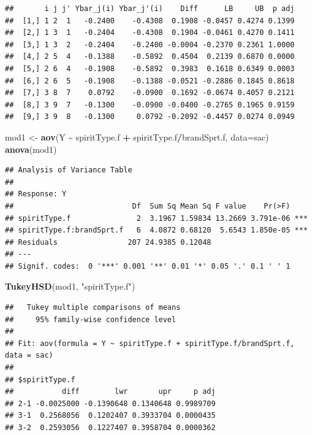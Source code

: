 \documentclass[
]{book}
\newenvironment{Shaded}{\begin{snugshade}}{\end{snugshade}}
\newcommand{\AttributeTok}[1]{\textcolor[rgb]{0.13,0.29,0.53}{#1}}
\newcommand{\FunctionTok}[1]{\textcolor[rgb]{0.13,0.29,0.53}{\textbf{#1}}}
\newcommand{\NormalTok}[1]{#1}
\newcommand{\OtherTok}[1]{\textcolor[rgb]{0.56,0.35,0.01}{#1}}
\newcommand{\SpecialCharTok}[1]{\textcolor[rgb]{0.81,0.36,0.00}{\textbf{#1}}}
\newcommand{\StringTok}[1]{\textcolor[rgb]{0.31,0.60,0.02}{#1}}
\begin{document}
\begin{verbatim}
##       i j j' Ybar_j(i) Ybar_j'(i)    Diff      LB     UB  p adj
##  [1,] 1 2  1   -0.2400    -0.4308  0.1908 -0.0457 0.4274 0.1399
##  [2,] 1 3  1   -0.2404    -0.4308  0.1904 -0.0461 0.4270 0.1411
##  [3,] 1 3  2   -0.2404    -0.2400 -0.0004 -0.2370 0.2361 1.0000
##  [4,] 2 5  4   -0.1388    -0.5892  0.4504  0.2139 0.6870 0.0000
##  [5,] 2 6  4   -0.1908    -0.5892  0.3983  0.1618 0.6349 0.0003
##  [6,] 2 6  5   -0.1908    -0.1388 -0.0521 -0.2886 0.1845 0.8618
##  [7,] 3 8  7    0.0792    -0.0900  0.1692 -0.0674 0.4057 0.2121
##  [8,] 3 9  7   -0.1300    -0.0900 -0.0400 -0.2765 0.1965 0.9159
##  [9,] 3 9  8   -0.1300     0.0792 -0.2092 -0.4457 0.0274 0.0949
\end{verbatim}

\begin{Shaded}
\begin{Highlighting}[]
\NormalTok{mod1 }\OtherTok{\textless{}{-}} \FunctionTok{aov}\NormalTok{(Y }\SpecialCharTok{\textasciitilde{}}\NormalTok{ spiritType.f }\SpecialCharTok{+}\NormalTok{ spiritType.f}\SpecialCharTok{/}\NormalTok{brandSprt.f, }\AttributeTok{data=}\NormalTok{sac)}
\FunctionTok{anova}\NormalTok{(mod1)}
\end{Highlighting}
\end{Shaded}

\begin{verbatim}
## Analysis of Variance Table
## 
## Response: Y
##                           Df  Sum Sq Mean Sq F value    Pr(>F)    
## spiritType.f               2  3.1967 1.59834 13.2669 3.791e-06 ***
## spiritType.f:brandSprt.f   6  4.0872 0.68120  5.6543 1.850e-05 ***
## Residuals                207 24.9385 0.12048                      
## ---
## Signif. codes:  0 '***' 0.001 '**' 0.01 '*' 0.05 '.' 0.1 ' ' 1
\end{verbatim}

\begin{Shaded}
\begin{Highlighting}[]
\FunctionTok{TukeyHSD}\NormalTok{(mod1, }\StringTok{"spiritType.f"}\NormalTok{)}
\end{Highlighting}
\end{Shaded}

\begin{verbatim}
##   Tukey multiple comparisons of means
##     95% family-wise confidence level
## 
## Fit: aov(formula = Y ~ spiritType.f + spiritType.f/brandSprt.f, data = sac)
## 
## $spiritType.f
##           diff        lwr       upr     p adj
## 2-1 -0.0025000 -0.1390648 0.1340648 0.9989709
## 3-1  0.2568056  0.1202407 0.3933704 0.0000435
## 3-2  0.2593056  0.1227407 0.3958704 0.0000362
\end{verbatim}
\end{document}
